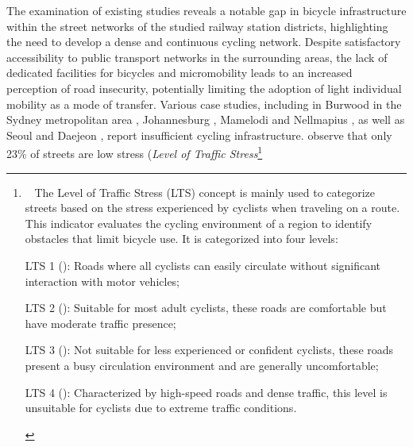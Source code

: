 \begin{refsegment}
The examination of existing studies reveals a notable gap in bicycle infrastructure within the street networks of the studied railway station districts, highlighting the need to develop a dense and continuous cycling network. Despite satisfactory accessibility to public transport networks in the surrounding areas, the lack of dedicated facilities for bicycles and micromobility leads to an increased perception of road insecurity, potentially limiting the adoption of light individual mobility as a mode of transfer. Various case studies, including in Burwood in the Sydney metropolitan area \textcolor{blue}{\autocite[12]{zhang_make_2023}}, Johannesburg \textcolor{blue}{\autocite[14]{risimati_spatial_2021}}, Mamelodi and Nellmapius \textcolor{blue}{\autocite[39]{bechstein_cycling_2010}}, as well as Seoul and Daejeon \textcolor{blue}{\autocite[45]{lee_strategies_2010}}, report insufficient cycling infrastructure. \textcolor{blue}{\textcite[6]{zuo_first-and-last_2020}} observe that only 23\% of streets are low stress (\textsl{Level of Traffic Stress}\footnote{~
    The Level of Traffic Stress (LTS) concept is mainly used to categorize streets based on the stress experienced by cyclists when traveling on a route. This indicator evaluates the cycling environment of a region to identify obstacles that limit bicycle use. It is categorized into four levels:
    \begin{customitemize}
    \item LTS 1 (): Roads where all cyclists can easily circulate without significant interaction with motor vehicles;
    \item LTS 2 (): Suitable for most adult cyclists, these roads are comfortable but have moderate traffic presence;
    \item LTS 3 (): Not suitable for less experienced or confident cyclists, these roads present a busy circulation environment and are generally uncomfortable;
    \item LTS 4 (): Characterized by high-speed roads and dense traffic, this level is unsuitable for cyclists due to extreme traffic conditions.
    \end{customitemize}
}
\end{refsegment}

